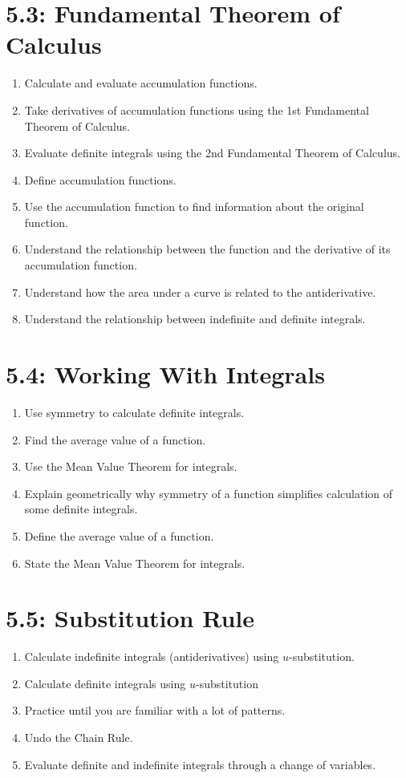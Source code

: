 \documentclass[11pt]{article}
\begin{document}
\section*{5.3: Fundamental Theorem of Calculus}
\begin{enumerate}
	\item Calculate and evaluate accumulation functions.
	\item Take derivatives of accumulation functions using the 1st Fundamental Theorem of Calculus.
	\item Evaluate definite integrals using the 2nd Fundamental Theorem of Calculus.
	\item Define accumulation functions.
	\item Use the accumulation function to find information about the original function.
	\item Understand the relationship between the function and the derivative of its accumulation function.
	\item Understand how the area under a curve is related to the antiderivative.
	\item Understand the relationship between indefinite and definite integrals.
\end{enumerate}

\section*{5.4: Working With Integrals}
\begin{enumerate}
	\item Use symmetry to calculate definite integrals.
	\item Find the average value of a function.
	\item Use the Mean Value Theorem for integrals.
	\item Explain geometrically why symmetry of a function simplifies calculation of some definite integrals.
	\item Define the average value of a function.
	\item State the Mean Value Theorem for integrals.
\end{enumerate}

\section*{5.5: Substitution Rule}
\begin{enumerate}
	\item Calculate indefinite integrals (antiderivatives) using $u$-substitution.
	\item Calculate definite integrals using $u$-substitution
	\item Practice until you are familiar with a lot of patterns.
	\item Undo the Chain Rule.
	\item Evaluate definite and indefinite integrals through a change of variables.
\end{enumerate}
\end{document}
